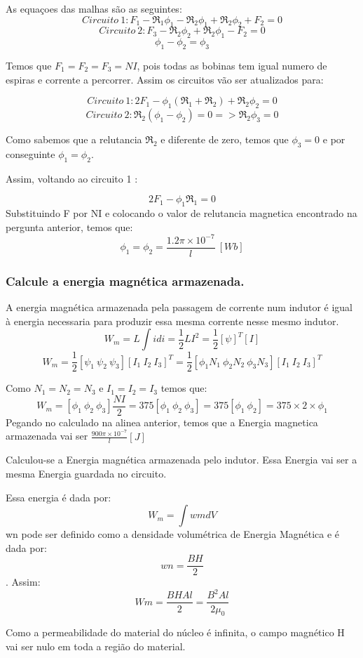 \documentclass{article}
\begin{document}
As equaçoes das malhas são as seguintes:
$$Circuito \ 1 : F_1 - \Re_1 \phi_1 - \Re_2 \phi_1 + \Re_2 \phi_2 + F_2 = 0$$
$$Circuito \ 2 :F_3 - \Re_2 \phi_2 + \Re_2 \phi_1 - F_2 = 0$$
$$\phi_1 - \phi_2 = \phi_3$$

Temos que $F_1 = F_2 = F_3 = NI$, pois todas as bobinas tem igual numero de espiras e corrente a percorrer. Assim os circuitos vão ser atualizados para:

$$Circuito \ 1 : 2F_1 - \phi_1(\Re_1 +\Re_2) + \Re_2 \phi_2 = 0$$
$$Circuito \ 2 : \Re_2 (\phi_1 - \phi_2) = 0 => \Re_2 \phi_3=0$$

Como sabemos que a relutancia $\Re_2$ e diferente de zero, temos que $\phi_3 = 0$ e por conseguinte $\phi_1 = \phi_2$.

Assim, voltando ao circuito 1 :

$$2F_1 - \phi_1 \Re_1 = 0$$
Substituindo F por NI e colocando o valor de relutancia magnetica encontrado na pergunta anterior, temos que:
$$\phi_1 = \phi_2 = \frac{1.2\pi\times 10^{-7}}{l} \ [Wb]$$

\subsubsection{Calcule a energia magnética armazenada.}
A energia magnética armazenada pela passagem de corrente num indutor é igual à energia necessaria para produzir essa mesma corrente nesse mesmo indutor.
$$W_m = L \int idi = \frac{1}{2} L I^{2} = \frac{1}{2}[\psi]^{T}[I] $$
$$W_m = \frac{1}{2}[\psi_1 \ \psi_2 \ \psi_3][I_1 \ I_2 \ I_3]^{T} = \frac{1}{2}[\phi_1 N_1 \ \phi_2 N_2 \ \phi_3 N_3][I_1 \ I_2 \ I_3]^{T} $$ 

Como $N_1 = N_2 = N_3$ e $I_1 = I_2 = I_3$ temos que:
$$W_m = [\phi_1  \ \phi_2  \ \phi_3 ]\frac{NI}{2} = 375 [\phi_1  \ \phi_2  \ \phi_3 ] = 375 [\phi_1  \ \phi_2] = 375\times 2\times \phi_1 $$
Pegando no calculado na alinea anterior, temos que a Energia magnetica armazenada vai ser $\frac{900\pi\times 10^{-7}}{l} [J]$

Calculou-se a Energia magnética armazenada pelo indutor. Essa Energia vai ser a mesma Energia guardada no circuito.

Essa energia é dada por:
$$W_m = \int wmdV$$
wn pode ser definido como a densidade volumétrica de Energia Magnética e é dada por:
$$wn = \frac{BH}{2}$$.
Assim:
$$Wm = \frac{BHAl}{2} = \frac{B^{2}Al}{2 \mu_0}$$

Como a permeabilidade do material do núcleo é infinita, o campo magnético H vai ser nulo em toda a região do material.
\end{document}
